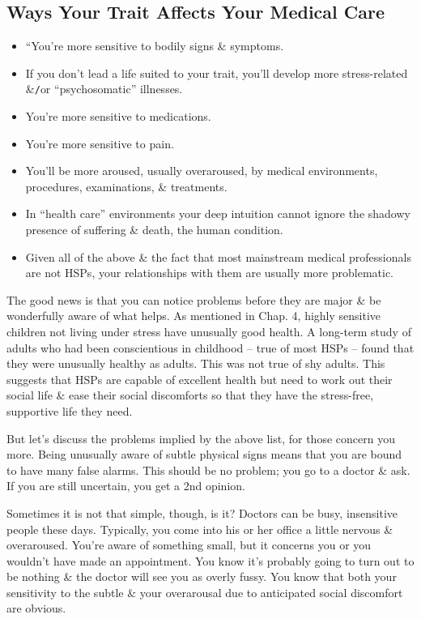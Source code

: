 \documentclass{article}
\numberwithin{equation}{section}
\begin{document}
\subsection{Ways Your Trait Affects Your Medical Care}

\begin{itemize}
	\item ``You're more sensitive to bodily signs \& symptoms.
	\item If you don't lead a life suited to your trait, you'll develop more stress-related \&{\tt/}or ``psychosomatic'' illnesses.
	\item You're more sensitive to medications.
	\item You're more sensitive to pain.
	\item You'll be more aroused, usually overaroused, by medical environments, procedures, examinations, \& treatments.
	\item In ``health care'' environments your deep intuition cannot ignore the shadowy presence of suffering \& death, the human condition.
	\item Given all of the above \& the fact that most mainstream medical professionals are not HSPs, your relationships with them are usually more problematic.
\end{itemize}
The good news is that you can notice problems before they are major \& be wonderfully aware of what helps. As mentioned in Chap. 4, highly sensitive children not living under stress have unusually good health. A long-term study of adults who had been conscientious in childhood -- true of most HSPs -- found that they were unusually healthy as adults. This was not true of shy adults. This suggests that HSPs are capable of excellent health but need to work out their social life \& ease their social discomforts so that they have the stress-free, supportive life they need.

But let's discuss the problems implied by the above list, for those concern you more. Being unusually aware of subtle physical signs means that you are bound to have many false alarms. This should be no problem; you go to a doctor \& ask. If you are still uncertain, you get a 2nd opinion.

Sometimes it is not that simple, though, is it? Doctors can be busy, insensitive people these days. Typically, you come into his or her office a little nervous \& overaroused. You're aware of something small, but it concerns you or you wouldn't have made an appointment. You know it's probably going to turn out to be nothing \& the doctor will see you as overly fussy. You know that both your sensitivity to the subtle \& your overarousal due to anticipated social discomfort are obvious.
\end{document}
